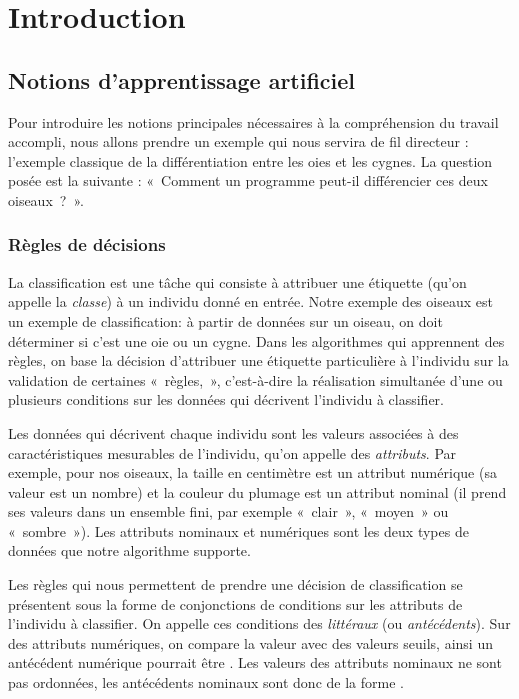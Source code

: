 \section{Introduction}

    \subsection{Notions d'apprentissage artificiel}

        Pour introduire les notions principales nécessaires à la compréhension du travail accompli, nous allons prendre un exemple qui nous servira de fil directeur : l’exemple classique de la différentiation entre les oies et les cygnes. La question posée est la suivante : «~Comment un programme peut-il différencier ces deux oiseaux~?~».

        \subsubsection{Règles de décisions}

            La classification est une tâche qui consiste à attribuer une étiquette (qu'on appelle la \emph{classe}) à un individu donné en entrée. Notre exemple des oiseaux est un exemple de classification: à partir de données sur un oiseau, on doit déterminer si c'est une oie ou un cygne. Dans les algorithmes qui apprennent des règles, on base la décision d'attribuer une étiquette particulière à l'individu sur la validation de certaines «~règles,~», c'est-à-dire la réalisation simultanée d'une ou plusieurs conditions sur les données qui décrivent l'individu à classifier.

            Les données qui décrivent chaque individu sont les valeurs associées à des caractéristiques mesurables de l'individu, qu'on appelle des \emph{attributs}. Par exemple, pour nos oiseaux, la taille en centimètre est un attribut numérique (sa valeur est un nombre) et la couleur du plumage est un attribut nominal (il prend ses valeurs dans un ensemble fini, par exemple «~clair~», «~moyen~» ou «~sombre~»). Les attributs nominaux et numériques sont les deux types de données que notre algorithme supporte.

            Les règles qui nous permettent de prendre une décision de classification se présentent sous la forme de conjonctions de conditions sur les attributs de l'individu à classifier. On appelle ces conditions des \emph{littéraux} (ou \emph{antécédents}). Sur des attributs numériques, on compare la valeur avec des valeurs seuils, ainsi un antécédent numérique pourrait être . Les valeurs des attributs nominaux ne sont pas ordonnées, les antécédents nominaux sont donc de la forme .

